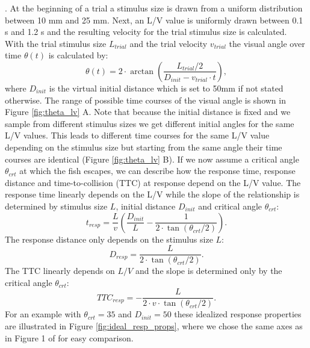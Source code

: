 \documentclass[a4paper,10pt,hidelinks]{scrreprt}
\begin{document}
	\cite{Bhattacharyya2017}.
	At the beginning of a trial a stimulus size is drawn from a uniform distribution between 10 mm and 25 mm.
	Next, an L/V value is uniformly drawn between 0.1 s and 1.2 s and the resulting velocity for the 
	trial stimulus size is calculated.
	With the trial stimulus size $L_{trial}$ and the trial velocity $v_{trial}$ the visual angle 
	over time $\theta(t)$ is calculated by:
	\begin{equation}
	\theta (t) = 2\cdot \arctan(\frac{L_{trial}/2}{D_{init} - v_{trial}\cdot t}),
	\label{eq:theta}
	\end{equation}
	where $D_{init}$ is the virtual initial distance which is set to 50mm if not stated otherwise.
    The range of possible time courses of the visual angle is shown in Figure \ref{fig:theta_lv} A.
    Note that because the initial distance is fixed and we sample from different stimulus sizes we get different initial angles for the same L/V values.
    This leads to different time courses for the same L/V value depending on the stimulus size but starting from the same angle their time courses are identical (Figure \ref{fig:theta_lv} B).
    If we now assume a critical angle $\theta_{crt}$ at which the fish escapes, we can describe how the response time, response distance and time-to-collision (TTC) at response depend on the L/V value.
    The response time linearly depends on the L/V while the slope of the relationship is determined by stimulus size $L$, initial distance $D_{init}$ and critical angle $\theta_{crt}$:
	\begin{equation}
	t_{resp} = \dfrac{L}{v} \left(\dfrac{D_{init}}{L} - \dfrac{1}{2\cdot\tan(\theta_{crt} /2)}\right).
	\label{eq:resp_time}
	\end{equation}
    The response distance only depends on the stimulus size $L$:
    \begin{equation}
	D_{resp} = \dfrac{L}{2\cdot \tan(\theta_{crt} /2)}.
	\label{eq:resp_dist}
	\end{equation}
    The TTC linearly depends on $L/V$ and the slope is determined only by the critical angle $\theta_{crt}$:
	\begin{equation}
	TTC_{resp} = - \dfrac{L}{2\cdot v\cdot \tan(\theta_{crt} /2)}.
	\label{eq:resp_ttc}
	\end{equation}
    For an example with $\theta_{crt}=35$ and $D_{init}=50$ these idealized response properties are illustrated in Figure \ref{fig:ideal_resp_props}, where we chose the same axes as in Figure 1 of \cite{Bhattacharyya2017} for easy comparison.\\
\end{document}
